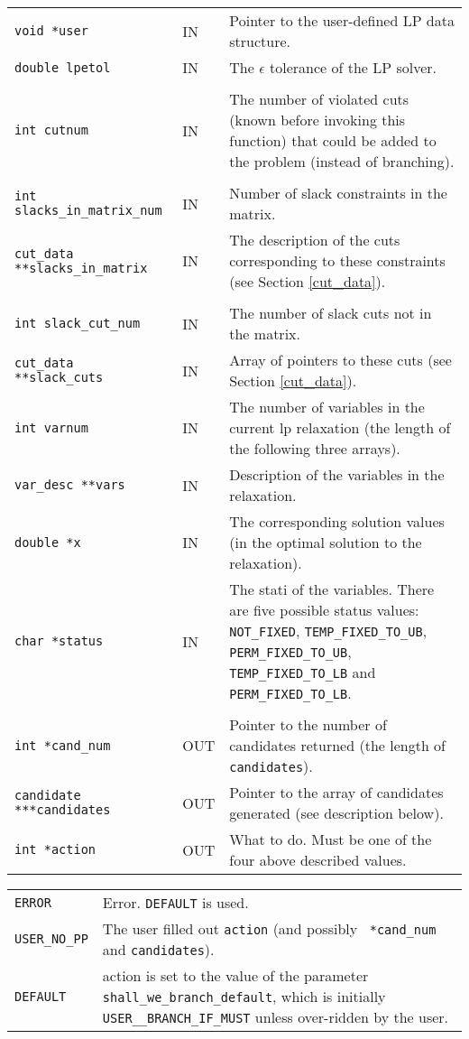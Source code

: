 \documentclass[twoside,11pt]{article}
\begin{document}
{\newpage
\clearpage
\samepage \begin{tabular}%
{llp{205pt}}
{\tt void *user} &  IN & Pointer to the user-defined LP data structure. \\ 
{\tt double lpetol} & IN & The $\epsilon$ tolerance of the LP solver. \\ 
& & \\ 
{\tt int cutnum} & IN & The number of violated cuts (known before invoking
this function) that could be added to the problem (instead of branching).\\ 
& & \\ 
{\tt int slacks\_in\_matrix\_num} & IN & Number of slack constraints in the
matrix. \\ 
{\tt cut\_data **slacks\_in\_matrix} & IN & The description of the cuts
corresponding to these constraints (see Section \ref{cut_data}). \\ 
& & \\ 
{\tt int slack\_cut\_num} & IN & The number of slack cuts not in the
matrix. \\ 
{\tt cut\_data **slack\_cuts} & IN & Array of pointers to these cuts
(see Section \ref{cut_data}).\\ 
{\tt int varnum} & IN & The number of variables in the current lp
relaxation (the length of the following three arrays).\\ 
{\tt var\_desc **vars} & IN & Description of the variables in the
relaxation. \\ 
{\tt double *x} & IN & The corresponding solution values (in the optimal
solution to the relaxation).\\ 
{\tt char *status} & IN & The stati of the variables. 
There are five possible status values: 
{\tt NOT\_\-FIXED}, {\tt TEMP\_\-FIXED\_\-TO\_\-UB}, {\tt
PERM\_\-FIXED\_\-TO\_\-UB}, {\tt TEMP\_\-FIXED\_\-TO\_\-LB} and {\tt
PERM\_\-FIXED\_\-TO\_\-LB}.\\  
& & \\ 
{\tt int *cand\_num} & OUT & Pointer to the number of candidates
returned (the length of {\tt *candidates}).\\ 
{\tt candidate ***candidates} & OUT & Pointer to the array of
candidates generated (see description below).\\ 
{\tt int *action} & OUT & What to do. Must be one of the four above described
values.
\end{tabular}
}

{\newpage
\clearpage
\samepage \begin{tabular}{lp{340pt}}
{\tt ERROR} & Error. {\tt DEFAULT} is used. \\ 
{\tt USER\_NO\_PP} & The user filled out {\tt *action} (and possibly {\tt
*cand\_num} and {\tt *candidates}). \\ 
{\tt DEFAULT} & action is set to the value of the parameter {\tt
shall\_we\_branch\_default}, which is initially
{\tt USER\_\_BRANCH\_IF\_MUST} unless over-ridden by the user. \\  
\end{tabular}
}
\end{document}
